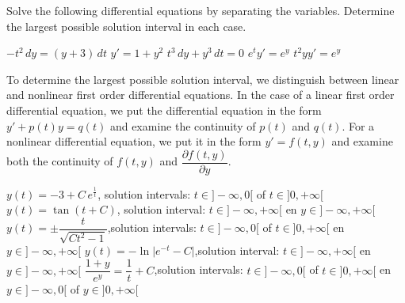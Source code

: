 \begin{Exercise}Solve the following differential equations by separating the variables. Determine the largest possible solution interval in each case. \par
\begin{multicols}{2}
    \Question $-t^2 \, dy = \left( y + 3 \right) \, dt$
    \Question $y' = 1 + y^2$
    \Question $t^3 \, dy + y^3 \, dt = 0$
    \Question $e^t y' = e^y$
    \Question $t^2 y y' = e^y$
    \EndCurrentQuestion
\end{multicols}
\end{Exercise}

 To determine the largest possible solution interval, we distinguish between linear and nonlinear first order differential equations. In the case of a linear first order differential equation, we put the differential equation in the form $y' + p(t)y = q(t)$ and examine the continuity of $p(t)$ and $q(t)$. For a nonlinear differential equation, we put it in the form $y' = f(t, y)$ and examine both the continuity of $f(t,y)$ and $\dfrac{\partial f(t,y)}{\partial y}$.

\begin{Answer}\phantom{}    
        \Question $y(t) = - 3 + C\,e^{\frac{1}{t}}$, \quad solution intervals: $t \in ]-\infty,0[$ of $t \in ]0,+\infty[$
        \Question $y(t) = \tan(t+C)$, \quad solution interval: $t \in ]-\infty,+\infty[$ en $y\in ]-\infty,+\infty[$
        \Question $y(t) = \pm \dfrac{t}{\sqrt{Ct^2-1}}$,\quad solution intervals: $t \in ]-\infty,0[$ of $t \in ]0, +\infty[$ en $y \in ]-\infty, +\infty[$ %
        \Question $y(t) = -\ln{\Big|e^{-t} - C\Big|}$,\quad solution interval: $t \in ]-\infty,+\infty[$ en $y \in ]-\infty,+\infty[$
        \Question $\dfrac{1+y}{e^y}=\dfrac{1}{t}+C$,\quad solution intervals: $t \in ]-\infty,0[$ of $t \in ]0,+\infty[$ en $y \in ]-\infty,0[$ of $y \in ]0,+\infty[$
\end{Answer}

